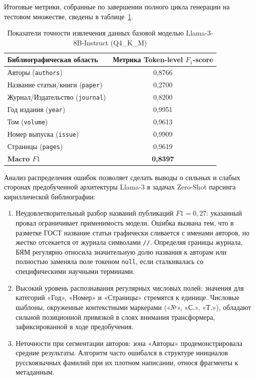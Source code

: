 Итоговые метрики, собранные по завершении полного цикла генерации на тестовом множестве, сведены в таблице~\ref{tab:base_results}. 

\begin{table}[h!]
\centering
\caption{Показатели точности извлечения данных базовой моделью Llama-3-8B-Instruct (Q4\_K\_M)}
\label{tab:base_results}
\begin{tabular}{|l|c|}
\hline
\textbf{Библиографическая область} & \textbf{Метрика Token-level $F_1$-score} \\ \hline
Авторы (\texttt{authors}) & 0,8766 \\ \hline
Название статьи/книги (\texttt{paper}) & 0,2700 \\ \hline
Журнал/Издательство (\texttt{journal}) & 0,8200 \\ \hline
Год издания (\texttt{year}) & 0,9951 \\ \hline
Том (\texttt{volume}) & 0,9613 \\ \hline
Номер выпуска (\texttt{issue}) & 0,9909 \\ \hline
Страницы (\texttt{pages}) & 0,9619 \\ \hline \hline
\textbf{Macro $F1$} & \textbf{0,8397} \\ \hline
\end{tabular}
\end{table}

Анализ распределения ошибок позволяет сделать выводы о сильных и слабых сторонах предобученной архитектуры Llama-3 в задачах Zero-Shot парсинга кириллической библиографии:
\begin{enumerate}     
    \item Неудовлетворительный разбор названий публикаций $F1=0,27$: указанный провал ограничивает применимость модели. Ошибка вызвана тем, что в разметке ГОСТ название статьи графически сливается с именами авторов, но жестко отсекается от журнала символами \texttt{//}. Определяя границы журнала, БЯМ регулярно относила значительную долю названия к авторам или полностью заменяла поле токеном \texttt{null}, если сталкивалась со специфическими научными терминами.
    \item Высокий уровень распознавания регулярных числовых полей: значения для категорий «Год», «Номер» и «Страницы» стремятся к единице. Числовые шаблоны, окруженные контекстными маркерами («№», «С.», «Т.»), обладают сильной позиционной привязкой в слоях внимания трансформера, зафиксированной в ходе предобучения.
    \item Неточности при сегментации авторов: зона «Авторы» продемонстрировала средние результаты. Алгоритм часто ошибался в структуре инициалов русскоязычных фамилий при их плотном написании, относя фрагменты к метаданным.
\end{enumerate}

